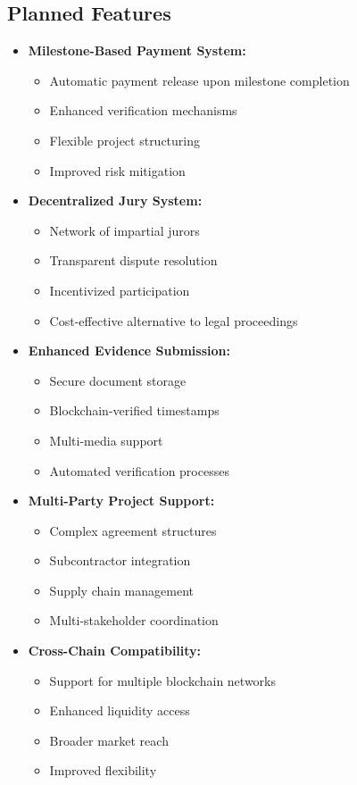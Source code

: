 \documentclass[12pt]{article}
\begin{document}
\subsection{Planned Features}
\begin{itemize}
    \item \textbf{Milestone-Based Payment System:}
    \begin{itemize}
        \item Automatic payment release upon milestone completion
        \item Enhanced verification mechanisms
        \item Flexible project structuring
        \item Improved risk mitigation
    \end{itemize}
    
    \item \textbf{Decentralized Jury System:}
    \begin{itemize}
        \item Network of impartial jurors
        \item Transparent dispute resolution
        \item Incentivized participation
        \item Cost-effective alternative to legal proceedings
    \end{itemize}
    
    \item \textbf{Enhanced Evidence Submission:}
    \begin{itemize}
        \item Secure document storage
        \item Blockchain-verified timestamps
        \item Multi-media support
        \item Automated verification processes
    \end{itemize}
    
    \item \textbf{Multi-Party Project Support:}
    \begin{itemize}
        \item Complex agreement structures
        \item Subcontractor integration
        \item Supply chain management
        \item Multi-stakeholder coordination
    \end{itemize}
    
    \item \textbf{Cross-Chain Compatibility:}
    \begin{itemize}
        \item Support for multiple blockchain networks
        \item Enhanced liquidity access
        \item Broader market reach
        \item Improved flexibility
    \end{itemize}
\end{itemize}
\end{document}
